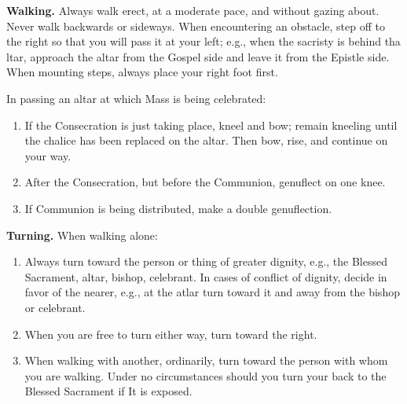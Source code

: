 \documentclass{report}
\begin{document}
{\rubric \textbf{Walking.} Always walk erect, at a moderate pace, and without
gazing about. Never walk backwards or sideways. When encountering an obstacle,
step off to the right so that you will pass it at your left; e.g., when the
sacristy is behind tha ltar, approach the altar from the Gospel side and leave
it from the Epistle side. When mounting steps, always place your right foot
first.

In passing an altar at which Mass is being celebrated:

\begin{enumerate}

    \item If the Consecration is just taking place, kneel and bow; remain
        kneeling until the chalice has been replaced on the altar. Then bow,
        rise, and continue on your way.

    \item After the Consecration, but before the Communion, genuflect on one
        knee.

    \item If Communion is being distributed, make a double genuflection.

\end{enumerate}

\rubric \textbf{Turning.} When walking alone:

\begin{enumerate}

    \item Always turn toward the person or thing of greater dignity, e.g., the
        Blessed Sacrament, altar, bishop, celebrant. In cases of conflict of
        dignity, decide in favor of the nearer, e.g., at the atlar turn toward
        it and away from the bishop or celebrant.

    \item When you are free to turn either way, turn toward the right.

    \item When walking with another, ordinarily, turn toward the person with
        whom you are walking. Under no circumstances should you turn your back
        to the Blessed Sacrament if It is exposed.

\end{enumerate}

}
\end{document}
